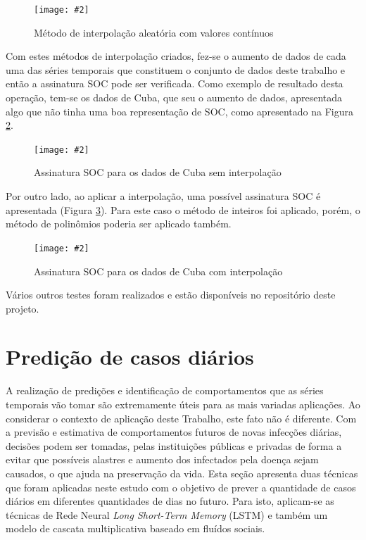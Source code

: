 \documentclass[a4paper,12pt]{article}
\newcommand{\image}[4]{
    \begin{figure}[H]%
        \begin{center}
        \caption{#3}
        \texttt{[image: \#2]}
        \label{#4}
        \end{center}
    \end{figure}
}
\begin{document}
\image{0.80}{images/interpolacao/exemplos/interp_polinomios.png}{Método de interpolação aleatória com valores contínuos}{figure:interp1d2}

\par Com estes métodos de interpolação criados, fez-se o aumento de dados de cada uma das séries temporais que constituem o conjunto de dados deste trabalho e então a assinatura SOC pode ser verificada. Como exemplo de resultado desta operação, tem-se os dados de Cuba, que seu o aumento de dados, apresentada algo que não tinha uma boa representação de SOC, como apresentado na Figura \ref{figure:soc_1}.

\image{0.85}{images/soc/pais/soc_cuba_nointerp.png}{Assinatura SOC para os dados de Cuba sem interpolação}{figure:soc_1}

\par Por outro lado, ao aplicar a interpolação, uma possível assinatura SOC é apresentada (Figura \ref{figure:soc_2}). Para este caso o método de inteiros foi aplicado, porém, o método de polinômios poderia ser aplicado também.

\image{0.85}{images/soc/pais/soc_cuba.png}{Assinatura SOC para os dados de Cuba com interpolação}{figure:soc_2}

\par Vários outros testes foram realizados e estão disponíveis no repositório deste projeto.

\section{Predição de casos diários}

\par A realização de predições e identificação de comportamentos que as séries temporais vão tomar são extremamente úteis para as mais variadas aplicações. Ao considerar o contexto de aplicação deste Trabalho, este fato não é diferente. Com a previsão e estimativa de comportamentos futuros de novas infecções diárias, decisões podem ser tomadas, pelas instituições públicas e privadas de forma a evitar que possíveis alastres e aumento dos infectados pela doença sejam causados, o que ajuda na preservação da vida. Esta seção apresenta duas técnicas que foram aplicadas neste estudo com o objetivo de prever a quantidade de casos diários em diferentes quantidades de dias no futuro. Para isto, aplicam-se as técnicas de Rede Neural \textit{Long Short-Term Memory} (LSTM) e também um modelo de cascata multiplicativa baseado em fluídos sociais.
\end{document}
